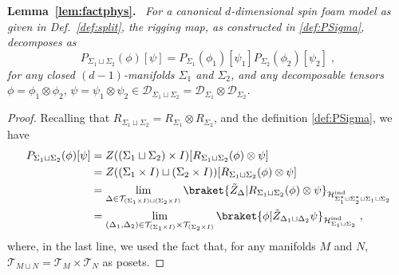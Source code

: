 \documentclass[11pt]{article}
\newcommand{\cD}{\mathcal{D}}
\newcommand{\h}{\mathcal{H}}
\theoremstyle{definition}
\numberwithin{equation}{section}
\begin{document}
\textbf{Lemma~\ref{lem:factphys}.}~\emph{
    For a canonical $d$-dimensional spin foam model as given in \emph{Def.~\ref{def:split}}, the rigging map, as constructed in \eqref{def:PSigma}, decomposes as
    \begin{equation}
        P_{\Sigma_1\sqcup\Sigma_2}(\phi)[\psi]=P_{\Sigma_1}(\phi_1)[\psi_1]P_{\Sigma_2}(\phi_2)[\psi_2]\;,
    \end{equation}
    for any closed $(d-1)$-manifolds $\Sigma_1$ and $\Sigma_2$, and any decomposable tensors $\phi=\phi_1\otimes\phi_2,\,\psi=\psi_1\otimes\psi_2\in\cD_{\Sigma_1\sqcup\Sigma_2}=\cD_{\Sigma_1}\otimes\cD_{\Sigma_2}$.
}
\begin{proof}
    Recalling that $R_{\Sigma_1\sqcup\Sigma_2}=R_{\Sigma_1}\otimes R_{\Sigma_2}$, and the definition \eqref{def:PSigma}, we have
        \begin{align}
            P_{\Sigma_1\sqcup\Sigma_2}(\phi)[\psi]&=Z((\Sigma_1\sqcup\Sigma_2)\times I)[R_{\Sigma_1\sqcup\Sigma_2}(\phi)\otimes \psi]\nonumber\\
            &=Z((\Sigma_1\times I)\sqcup(\Sigma_2\times I))[R_{\Sigma_1\sqcup\Sigma_2}(\phi)\otimes \psi]\nonumber\\
            &=\lim_{\Delta\in\mathcal{T}_{(\Sigma_1\times I)\sqcup(\Sigma_2\times I)}}\braket{\tilde{Z}_\Delta|R_{\Sigma_1\sqcup\Sigma_2}(\phi)\otimes\psi}_{\h^{\rm ind}_{\Sigma_1^*\sqcup\Sigma_2^*\sqcup\Sigma_1\sqcup\Sigma_2}}\nonumber\\
            &=\lim_{(\Delta_1,\Delta_2)\in\mathcal{T}_{(\Sigma_1\times I)}\times\mathcal{T}_{(\Sigma_2\times I)}}\braket{\phi|\tilde{Z}_{\Delta_1\sqcup\Delta_2}\psi}_{\h^{\rm ind}_{\Sigma_1\sqcup\Sigma_2}}\;,\label{eq:PSigmacanSF}
        \end{align}
    where, in the last line, we used the fact that, for any manifolds $M$ and $N$, $\mathcal{T}_{M\sqcup N}=\mathcal{T}_M\times\mathcal{T}_N$ as posets.
    

\end{proof}
\end{document}
